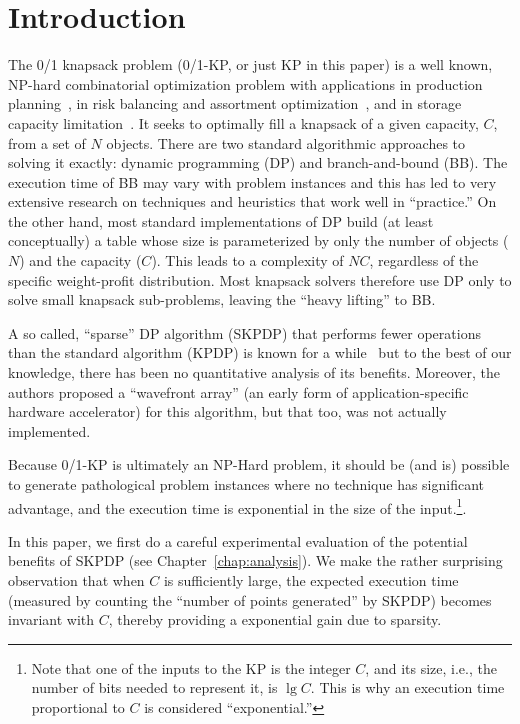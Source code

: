\chapter{Introduction}
\label{chap:intro}
The 0/1 knapsack problem (0/1-KP, or just KP in this paper) is a well known,
NP-hard combinatorial optimization problem with applications in production
planning~\cite{Camargo-etal-COR-2012}, in risk balancing and assortment
optimization~\cite{Rooderkerk-vanHeerde-EJOR-2016}, and in storage capacity
limitation~\cite{Jolai-etal-AppMathComp-2007}.  It seeks to optimally fill a
knapsack of a given capacity, $C$, from a set of $N$ objects.  There are two
standard algorithmic approaches to solving it exactly: dynamic programming
(DP) and branch-and-bound (BB).  The execution time of BB may vary with
problem instances and this has led to very extensive research on techniques
and heuristics that work well in ``practice.''  On the other hand, most
standard implementations of DP build (at least conceptually) a table whose
size is parameterized by only the number of objects ($N$) and the capacity
($C$).  This leads to a complexity of $NC$, regardless of the specific
weight-profit distribution.  Most knapsack solvers therefore use DP only to
solve small knapsack sub-problems, leaving the ``heavy lifting'' to BB.
  
A so called, ``sparse'' DP algorithm (SKPDP) that performs fewer operations
than the standard algorithm (KPDP) is known for a while~\cite{sanjay-asap94,
  sanjay-irreg96} but to the best of our knowledge, there has been no
quantitative analysis of its benefits.  Moreover, the authors proposed a
``wavefront array'' (an early form of application-specific hardware
accelerator) for this algorithm, but that too, was not actually implemented.

Because 0/1-KP is ultimately an NP-Hard problem, it should be (and is)
possible to generate pathological problem instances where no technique has
significant advantage, and the execution time is exponential in the size of
the input.\footnote{Note that one of the inputs to the KP is the integer $C$,
  and its size, i.e., the number of bits needed to represent it, is $\lg C$.
  This is why an execution time proportional to $C$ is considered
  ``exponential.''}.

In this paper, we first do a careful experimental evaluation of the potential
benefits of SKPDP (see Chapter~\ref{chap:analysis}).  We make the rather
surprising observation that when $C$ is sufficiently large, the expected
execution time (measured by counting the ``number of points generated'' by
SKPDP) becomes invariant with $C$, thereby providing a exponential gain due to
sparsity.

